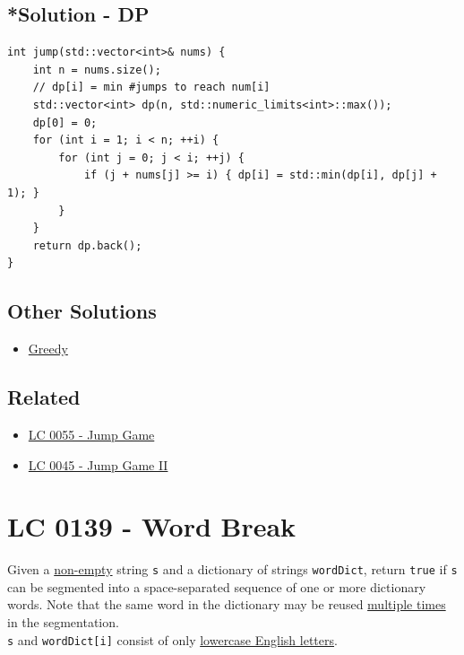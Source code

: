 \subsection*{*Solution - DP}\label{solution:lc0045_dp}
\begin{lstlisting}
int jump(std::vector<int>& nums) {
	int n = nums.size();
	// dp[i] = min #jumps to reach num[i]
	std::vector<int> dp(n, std::numeric_limits<int>::max());
	dp[0] = 0;
	for (int i = 1; i < n; ++i) {
		for (int j = 0; j < i; ++j) {
			if (j + nums[j] >= i) { dp[i] = std::min(dp[i], dp[j] + 1); }
		}
	}
	return dp.back();
}
\end{lstlisting}

\subsection*{Other Solutions}
\begin{itemize}
\item \hyperref[solution:lc0045_greedy]{Greedy}
\end{itemize}

\subsection*{Related}
\begin{itemize}
	\item \hyperref[lc0055]{LC 0055 - Jump Game}
	\item \hyperref[lc0045]{LC 0045 - Jump Game II}
\end{itemize}

\section{LC 0139 - Word Break}\label{lc0139}
Given a \ul{non-empty} string {\colorbox{CodeBackground}{\lstinline|s|}} and a dictionary of strings {\colorbox{CodeBackground}{\lstinline|wordDict|}}, return {\colorbox{CodeBackground}{\lstinline|true|}} if {\colorbox{CodeBackground}{\lstinline|s|}} can be segmented into a space-separated sequence of one or more dictionary words. Note that the same word in the dictionary may be reused \ul{multiple times} in the segmentation.\\

{\colorbox{CodeBackground}{\lstinline|s|}} and {\colorbox{CodeBackground}{\lstinline|wordDict[i]|}} consist of only \ul{lowercase English letters}.\\

